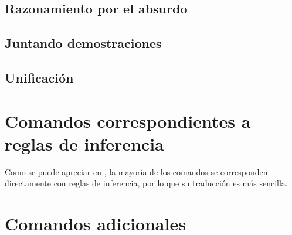 \subsection{Razonamiento por el absurdo}


\subsection{Juntando demostraciones}


\subsection{Unificación}
\label{ppa:sec:unification}

\section{Comandos correspondientes a reglas de inferencia}

Como se puede apreciar en , la
mayoría de los comandos se corresponden directamente con reglas de inferencia,
por lo que su traducción es más sencilla.

\section{Comandos adicionales}


